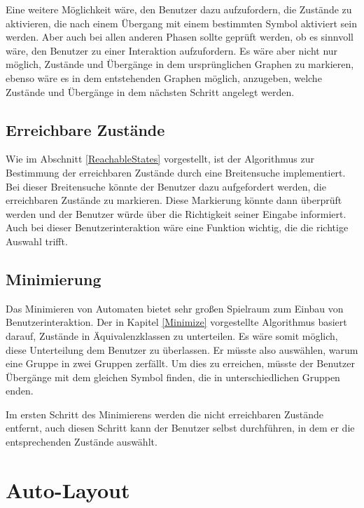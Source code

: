 Eine weitere Möglichkeit wäre, den Benutzer dazu aufzufordern, die Zustände zu
aktivieren, die nach einem Übergang mit einem bestimmten Symbol aktiviert sein
werden. Aber auch bei allen anderen Phasen sollte geprüft werden, ob es sinnvoll
wäre, den Benutzer zu einer Interaktion aufzufordern. Es wäre aber nicht nur
möglich, Zustände und Übergänge in dem ursprünglichen Graphen zu markieren,
ebenso wäre es in dem entstehenden Graphen möglich, anzugeben, welche Zustände und
Übergänge in dem nächsten Schritt angelegt werden.\vspace{10pt}


\subsection{Erreichbare Zustände}\label{PerspectiveReachableStates}
Wie im Abschnitt \ref{ReachableStates} vorgestellt, ist der Algorithmus zur
Bestimmung der erreichbaren Zustände durch eine Breitensuche implementiert. Bei
dieser Breitensuche könnte der Benutzer dazu aufgefordert werden, die
erreichbaren Zustände zu markieren. Diese Markierung könnte dann überprüft werden
und der Benutzer würde über die Richtigkeit seiner Eingabe informiert. Auch bei
dieser Benutzerinteraktion wäre eine Funktion wichtig, die die richtige Auswahl
trifft.\vspace{10pt}


\subsection{Minimierung}\label{PerspectiveMinimize}
Das Minimieren von Automaten bietet sehr großen Spielraum zum Einbau von
Benutzerinteraktion. Der in Kapitel \ref{Minimize} vorgestellte Algorithmus
basiert darauf, Zustände in Äquivalenz\-klassen zu unterteilen. Es wäre somit
möglich, diese Unterteilung dem Benutzer zu überlassen. Er müsste also
auswählen, warum eine Gruppe in zwei Gruppen zerfällt. Um dies zu erreichen,
müsste der Benutzer Übergänge mit dem gleichen Symbol finden, die in
unterschiedlichen Gruppen enden.\vspace{10pt}

Im ersten Schritt des Minimierens werden die nicht erreichbaren Zustände
entfernt, auch diesen Schritt kann der Benutzer selbst durchführen, in dem er die
entsprechenden Zustände auswählt.\vspace{10pt}


\section{Auto-Layout}\label{PerspectiveAutoLayout}

